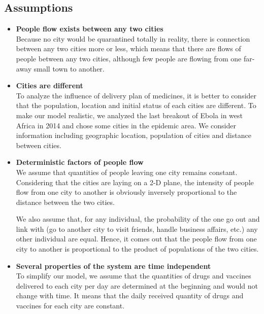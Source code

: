 \subsection{Assumptions}
\begin{itemize}
	\item \textbf{People flow exists between any two cities }\\
	      Because no city would be quarantined totally in reality, there is connection between any two cities more or less, which means that there are flows of people between any two cities, although few people are flowing from one far-away small town to another.
	\item \textbf{Cities are different}\\
	      To analyze the influence of delivery plan of medicines, it is better to consider that the population, location and initial status of each cities are different. To make our model realistic, we analyzed the last breakout of Ebola in west Africa in 2014 and chose some cities in the epidemic area. We consider information including geographic location, population of cities and distance between cities.
	\item \textbf{Deterministic factors of people flow}\\
	      We assume that quantities of people leaving one city remains constant. Considering that the cities are laying on a 2-D plane, the intensity of people flow from one city to another is obviously inversely proportional to the distance between the two cities.

	      We also assume that, for any individual, the probability of the one go out and link with (go to another city to visit friends, handle business affairs, etc.) any other individual are equal. Hence, it comes out that the people flow from one city to another is proportional to the product of populations of the two cities.

	\item \textbf{Several properties of the system are time independent}\\
	      To simplify our model, we assume that the quantities of drugs and vaccines delivered to each city per day are determined at the beginning and would not change with time. It means that the daily received quantity of drugs and vaccines for each city are constant. %


\end{itemize}
